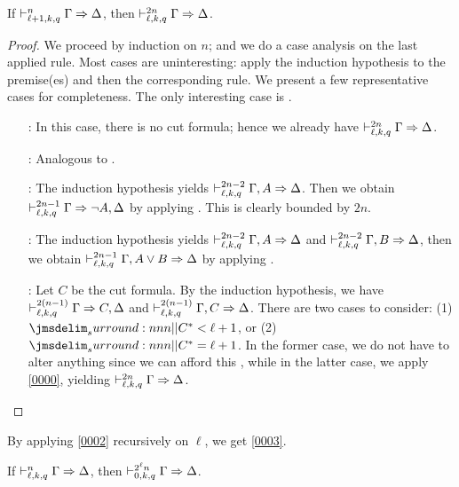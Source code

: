 \documentclass[a4paper]{article}
\begin{document}
\begin{lemma}\label{0002}
  If $\mathrel{\vdash^{n}_{\ell + 1,k,q}} \Gamma \Rightarrow \Delta$, then $\mathrel{\vdash^{2n}_{\ell,k,q}} \Gamma \Rightarrow \Delta$.
\end{lemma}
\begin{proof}
  We proceed by induction on $n$; and we do a case analysis on the last applied rule.
  Most cases are uninteresting: apply the induction hypothesis to the premise(es) and then the corresponding rule.
  We present a few representative cases for completeness.
  The only interesting case is \rCut.
  \begin{itemize}
  \item[\rId:] In this case, there is no cut formula; hence we already have $\mathrel{\vdash^{2n}_{\ell,k,q}} \Gamma \Rightarrow \Delta$.
  \item[\rLBot:] Analogous to \rId.
  \item[\rRNot:] The induction hypothesis yields $\mathrel{\vdash^{2n - 2}_{\ell,k,q}} \Gamma, A \Rightarrow \Delta$.
    Then we obtain $\mathrel{\vdash^{2n - 1}_{\ell,k,q}} \Gamma \Rightarrow \lnot A, \Delta$ by applying \rRNot.
    This is clearly bounded by $2n$.
  \item[\rLDis:] The induction hypothesis yields $\mathrel{\vdash^{2n - 2}_{\ell,k,q}} \Gamma, A \Rightarrow \Delta$ and $\mathrel{\vdash^{2n - 2}_{\ell,k,q}} \Gamma, B \Rightarrow \Delta$, then we obtain $\mathrel{\vdash^{2n - 1}_{\ell,k,q}} \Gamma, A \vee B \Rightarrow \Delta$ by applying \rLDis.
  \item[\rCut:] Let $C$ be the cut formula.
    By the induction hypothesis, we have $\mathrel{\vdash^{2(n-1)}_{\ell,k,q}} \Gamma \Rightarrow C,\Delta$ and $\mathrel{\vdash^{2(n-1)}_{\ell,k,q}} \Gamma,C \Rightarrow \Delta$.
    There are two cases to consider: (1) $\dRank{C} < \ell + 1$, or (2) $\dRank{C} = \ell + 1$.
    In the former case, we do not have to alter anything since we can afford this \rCut, while in the latter case, we apply \cref{0000}, yielding $\mathrel{\vdash^{2n}_{\ell,k,q}} \Gamma \Rightarrow \Delta$.
  \end{itemize}
\end{proof}

By applying \cref{0002} recursively on $\ell$, we get \cref{0003}.

\begin{corollary}\label{0003}
  If $\mathrel{\vdash^{n}_{\ell,k,q}} \Gamma \Rightarrow \Delta$, then $\mathrel{\vdash^{2^{\ell}n}_{0,k,q}} \Gamma \Rightarrow \Delta$.
\end{corollary}
\end{document}
